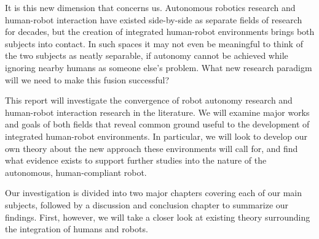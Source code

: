 \documentclass{sfuthesis}
\begin{document}

It is this new dimension that concerns us. Autonomous robotics research and human-robot interaction have existed side-by-side as separate fields of research for decades, but the creation of integrated human-robot environments brings both subjects into contact. In such spaces it may not even be meaningful to think of the two subjects as neatly separable, if autonomy cannot be achieved while ignoring nearby humans as someone else's problem. What new research paradigm will we need to make this fusion successful?

This report will investigate the convergence of robot autonomy research and human-robot interaction research in the literature. We will examine major works and goals of both fields that reveal common ground useful to the development of integrated human-robot environments. In particular, we will look to develop our own theory about the new approach these environments will call for, and find what evidence exists to support further studies into the nature of the autonomous, human-compliant robot.

Our investigation is divided into two major chapters covering each of our main subjects, followed by a discussion and conclusion chapter to summarize our findings. First, however, we will take a closer look at existing theory surrounding the integration of humans and robots.







\end{document}
